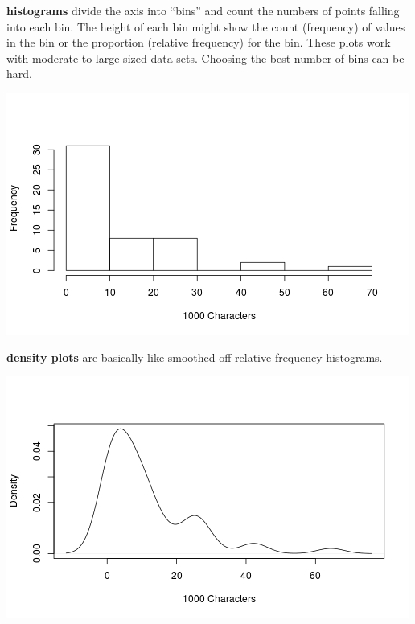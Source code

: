 \begin{list}{}{}
\begin{list}{}{}
  \item [\bf histograms] divide the axis into ``bins'' and count the
    numbers of points falling into each bin.  The height of each bin might
    show the count (frequency) of values in the bin or the proportion
    (relative frequency) for the bin.  These plots work with moderate
    to large sized data sets.  Choosing the best number of bins can be
    hard. \vspace{-.4cm}
  \begin{center}
  \includegraphics[width = .6\linewidth]{../plots/histogramDemo1.png}
  \end{center}


  \item [\bf density plots] are basically like smoothed off
        relative frequency histograms. \vspace{-.4cm}

  \begin{center}
  \includegraphics[width = .6\linewidth]{../plots/densityDemo1.png}
  \end{center}


\end{list}
\end{list}
